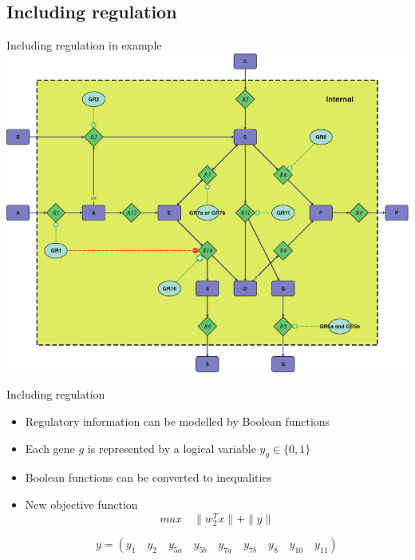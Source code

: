 \documentclass{beamer}
\begin{document}
\subsection{Including regulation}
\begin{frame}{Including regulation in example}
    \includegraphics[width=.9\textwidth]{grafik/fig1} \\
\end{frame}


\begin{frame}{Including regulation}
\begin{itemize}
    \item Regulatory information can be modelled by Boolean functions
    \item Each gene $g$ is represented by a logical variable $y_{g} \in \{0,1\}$
    \item Boolean functions can be converted to inequalities
    \item New objective function 
    $$max \quad \|w_{2}^{T} x \| + \|y\| $$
    \begin{example}
        $$ y =  (y_{1} \quad y_{2} \quad y_{5a} \quad y_{5b} \quad y_{7a} \quad y_{7b} \quad y_{8} \quad y_{10} \quad y_{11})$$
    \end{example}
\end{itemize}

\end{frame}
\end{document}
